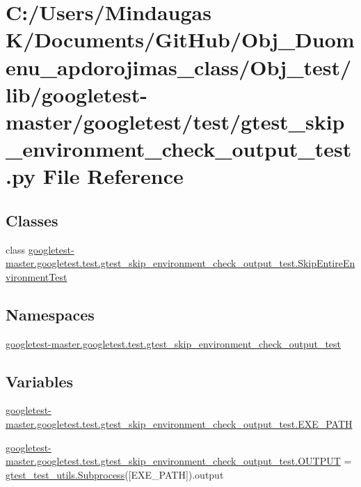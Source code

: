 \hypertarget{_obj__test_2lib_2googletest-master_2googletest_2test_2gtest__skip__environment__check__output__test_8py}{}\section{C\+:/\+Users/\+Mindaugas K/\+Documents/\+Git\+Hub/\+Obj\+\_\+\+Duomenu\+\_\+apdorojimas\+\_\+class/\+Obj\+\_\+test/lib/googletest-\/master/googletest/test/gtest\+\_\+skip\+\_\+environment\+\_\+check\+\_\+output\+\_\+test.py File Reference}
\label{_obj__test_2lib_2googletest-master_2googletest_2test_2gtest__skip__environment__check__output__test_8py}
\subsection*{Classes}
\begin{DoxyCompactItemize}
\item 
class \mbox{\hyperlink{classgoogletest-master_1_1googletest_1_1test_1_1gtest__skip__environment__check__output__test_1_1_skip_entire_environment_test}{googletest-\/master.\+googletest.\+test.\+gtest\+\_\+skip\+\_\+environment\+\_\+check\+\_\+output\+\_\+test.\+Skip\+Entire\+Environment\+Test}}
\end{DoxyCompactItemize}
\subsection*{Namespaces}
\begin{DoxyCompactItemize}
\item 
 \mbox{\hyperlink{namespacegoogletest-master_1_1googletest_1_1test_1_1gtest__skip__environment__check__output__test}{googletest-\/master.\+googletest.\+test.\+gtest\+\_\+skip\+\_\+environment\+\_\+check\+\_\+output\+\_\+test}}
\end{DoxyCompactItemize}
\subsection*{Variables}
\begin{DoxyCompactItemize}
\item 
\mbox{\hyperlink{namespacegoogletest-master_1_1googletest_1_1test_1_1gtest__skip__environment__check__output__test_a24d2267b249d3f26eaafb4224a29ac12}{googletest-\/master.\+googletest.\+test.\+gtest\+\_\+skip\+\_\+environment\+\_\+check\+\_\+output\+\_\+test.\+E\+X\+E\+\_\+\+P\+A\+TH}}
\item 
\mbox{\hyperlink{namespacegoogletest-master_1_1googletest_1_1test_1_1gtest__skip__environment__check__output__test_a4762ff7226dd1a2284e5f52de80a648a}{googletest-\/master.\+googletest.\+test.\+gtest\+\_\+skip\+\_\+environment\+\_\+check\+\_\+output\+\_\+test.\+O\+U\+T\+P\+UT}} = \mbox{\hyperlink{classgtest__test__utils_1_1_subprocess}{gtest\+\_\+test\+\_\+utils.\+Subprocess}}(\mbox{[}E\+X\+E\+\_\+\+P\+A\+TH\mbox{]}).output
\end{DoxyCompactItemize}
